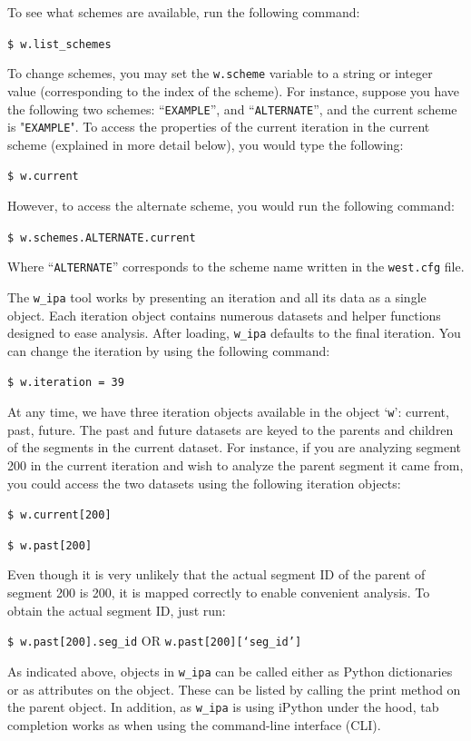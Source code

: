\documentclass[9pt,tutorial]{livecoms}
\begin{document}
To see what schemes are available, run the following command:

\verb|$ w.list_schemes|

To change schemes, you may set the \verb|w.scheme| variable to a string or integer value (corresponding to the index of the scheme). 
For instance, suppose you have the following two schemes: “\verb|EXAMPLE|”, and “\verb|ALTERNATE|”, and the current scheme is "\verb|EXAMPLE|". 
To access the properties of the current iteration in the current scheme (explained in more detail below), you would type the following:

\verb|$ w.current|

However, to access the alternate scheme, you would run the following command:

\verb|$ w.schemes.ALTERNATE.current|

Where “\verb|ALTERNATE|” corresponds to the scheme name written in the \verb|west.cfg| file.

The \verb|w_ipa| tool works by presenting an iteration and all its data as a single object. Each iteration object contains numerous datasets and helper functions designed to ease analysis. 
After loading, \verb|w_ipa| defaults to the final iteration. 
You can change the iteration by using the following command: 

\verb|$ w.iteration = 39|

At any time, we have three iteration objects available in the object ‘\verb|w|’: current, past, future. 
The past and future datasets are keyed to the parents and children of the segments in the current dataset. 
For instance, if you are analyzing segment 200 in the current iteration and wish to analyze the parent segment it came from, you could access the two datasets using the following iteration objects:

\verb|$ w.current[200]|

\verb|$ w.past[200]|

Even though it is very unlikely that the actual segment ID of the parent of segment 200 is 200, it is mapped correctly to enable convenient analysis. 
To obtain the actual segment ID, just run:

\verb|$ w.past[200].seg_id| OR \verb|w.past[200][‘seg_id’]|

As indicated above, objects in \verb|w_ipa| can be called either as Python dictionaries or as attributes on the object. 
These can be listed by calling the print method on the parent object. 
In addition, as \verb|w_ipa| is using iPython under the hood, tab completion works as when using the command-line interface (CLI).
\end{document}
